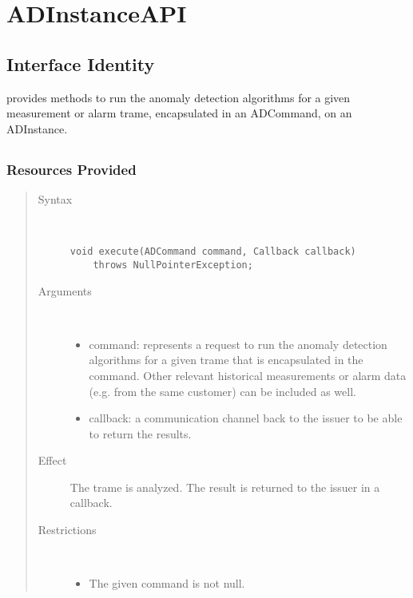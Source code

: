 \section{ADInstanceAPI}
\label{api:ad-instance-api}

\subsection{Interface Identity}

\npar {} provides methods to run the anomaly detection
algorithms for a given measurement or alarm trame, encapsulated in an ADCommand,
on an ADInstance.

\subsection{}

\subsubsection{Resources Provided}

\begin{quote}
	\begin{description}
		\item[Syntax] \ 
		\begin{verbatim}
void execute(ADCommand command, Callback callback) 
    throws NullPointerException;
		\end{verbatim}
		\item[Arguments] \
		\begin{itemize}
			\item command: represents a request to run the anomaly detection algorithms
			for a given trame that is encapsulated in the command. Other relevant
			historical measurements or alarm data (e.g. from the same customer) can be
			included as well.
			\item callback: a communication channel back to the issuer to be able to
			return the results.
		\end{itemize}
		\item[Effect] The trame is analyzed. The result is returned to the issuer in a
		callback.
		\item[Restrictions] \ 
		\begin{itemize}
			\item The given command is not null.
		\end{itemize}
	\end{description} 
\end{quote}

